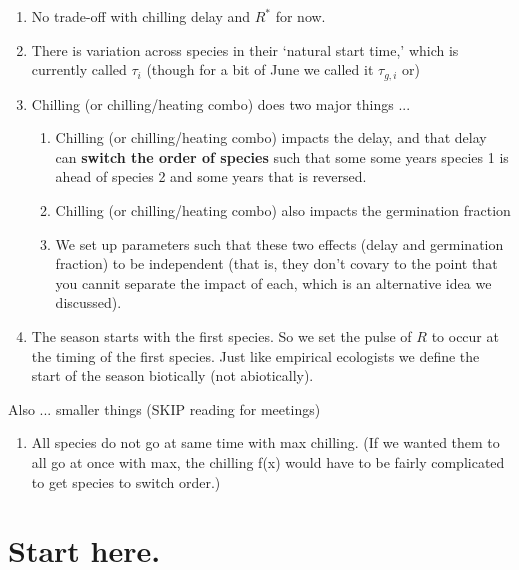 \documentclass[11pt,letter]{article}
\begin{document}
\begin{enumerate}
\item No trade-off with chilling delay and $R^*$ for now. 
\item There is variation across species in their `natural start time,' which is currently called $\tau_{i}$ (though for a bit of June we called it $\tau_{g,i}$ or)
\item Chilling (or chilling/heating combo) does two major things ... 
\begin{enumerate}
\item Chilling (or chilling/heating combo) impacts the delay, and that delay can {\bf switch the order of species} such that some some years species 1 is ahead of species 2 and some years that is reversed.
\item Chilling (or chilling/heating combo) also impacts the germination fraction
\item We set up parameters such that these two effects (delay and germination fraction) to be independent (that is, they don't covary to the point that you cannit separate the impact of each, which is an alternative idea we discussed). 
\end{enumerate}
\item The season starts with the first species. So we set the pulse of $R$ to occur at the timing of the first species. Just like empirical ecologists we define the start of the season biotically (not abiotically). 
\end{enumerate}

Also ... smaller things (SKIP reading for meetings)
\begin{enumerate}
\item All species do not go at same time with max chilling. (If we wanted them to all go at once with max, the chilling f(x) would have to be fairly complicated to get species to switch order.) 
\end{enumerate}

\section{Start here.} 
\end{document}

